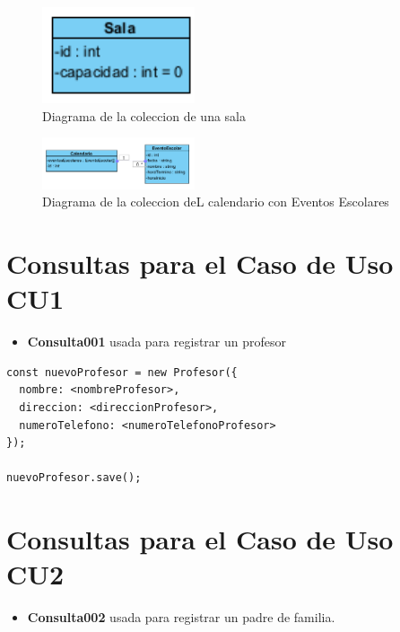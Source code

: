 \begin{figure}[htbp]
\centering
\includegraphics[width=0.4\textwidth]{images/arqui/sala.png}
\caption{Diagrama de la coleccion de una sala}
\label{fig:colecSala}
\end{figure}

\begin{figure}[htbp]
\centering
\includegraphics[width=0.4\textwidth]{images/arqui/colCaEv.png}
\caption{Diagrama de la coleccion deL calendario con Eventos Escolares}
\label{fig:colecEventCald}
\end{figure}
\clearpage

\section{Consultas para el Caso de Uso CU1}

\begin{itemize}
    \item \textbf{Consulta001} usada para registrar un profesor
\end{itemize}

\begin{verbatim}
const nuevoProfesor = new Profesor({
  nombre: <nombreProfesor>,
  direccion: <direccionProfesor>,
  numeroTelefono: <numeroTelefonoProfesor>
});
    
nuevoProfesor.save();
\end{verbatim}


\section{Consultas para el Caso de Uso CU2}

\begin{itemize}
    \item \textbf{Consulta002} usada para registrar un padre de familia.
\end{itemize}

